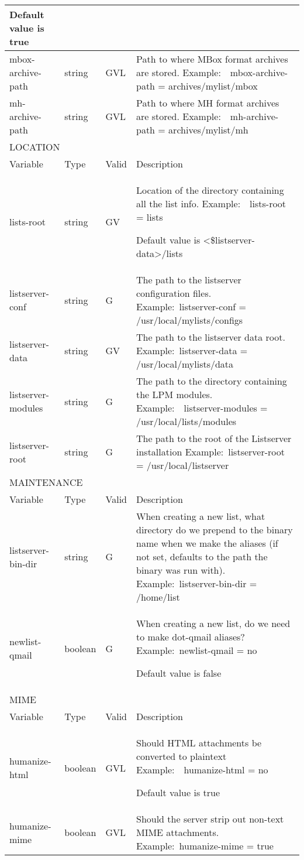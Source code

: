 \documentclass{book}
\begin{document}
\begin{longtable}{p{30mm}llp{60mm}}
Default value is true\\
\hline
mbox-archive-path & string & GVL & Path to where MBox format archives are stored.
Example:  mbox-archive-path = archives/mylist/mbox\\
\hline
mh-archive-path & string & GVL & Path to where MH format archives are stored.
Example:  mh-archive-path = archives/mylist/mh\\
\hline
\multicolumn{4}{l}{LOCATION}\\
\hline
Variable & Type & Valid & Description\\
\hline
lists-root & string & GV & Location of the directory containing all the list info.
Example:  lists-root = lists

Default value is \textless\$listserver-data\textgreater/lists\\
\hline
listserver-conf & string & G & The path to the listserver configuration files.
Example: listserver-conf = /usr/local/mylists/configs\\
\hline
listserver-data & string & GV & The path to the listserver data root.
Example: listserver-data = /usr/local/mylists/data\\
\hline
listserver-modules & string & G & The path to the directory containing the LPM modules.
Example:  listserver-modules = /usr/local/lists/modules\\
\hline
listserver-root & string & G & The path to the root of the Listserver installation
Example: listserver-root = /usr/local/listserver\\
\hline
\multicolumn{4}{l}{MAINTENANCE}\\
\hline
Variable & Type & Valid & Description\\
\hline
listserver-bin-dir & string & G & When creating a new list, what directory do we prepend to
the binary name when we make the aliases (if not set, defaults to the path the binary was run with).
Example: listserver-bin-dir = /home/list\\
\hline
newlist-qmail & boolean & G & When creating a new list, do we need to make dot-qmail aliases?
Example: newlist-qmail = no

Default value is false\\
\hline
\multicolumn{4}{l}{MIME}\\
\hline
Variable & Type & Valid & Description\\
\hline
humanize-html & boolean & GVL & Should HTML attachments be converted to plaintext
Example:  humanize-html = no

Default value is true\\
\hline
humanize-mime & boolean & GVL & Should the server strip out non-text MIME attachments.
Example: humanize-mime = true


\end{longtable}
\end{document}
